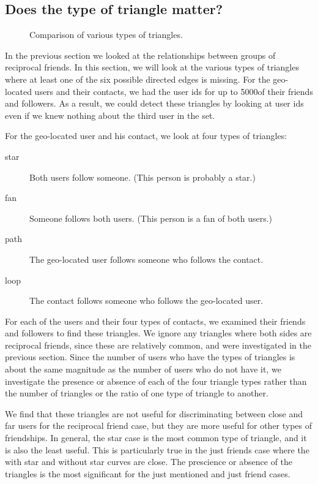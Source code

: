 \documentclass{sig-alternate}
\begin{document}
\subsection{Does the type of triangle matter?}
\begin{figure*}
\centering
{}
\caption{
Comparison of various types of triangles.
}
\label{fig:TriadTypes}
\end{figure*}
In the previous section we looked at the relationships between groups of reciprocal friends.
In this section, we will look at the various types of triangles where at least one of the six possible directed edges is missing.
For the geo-located users and their contacts, we had the user ids for up to 5000of their friends and followers. As a result, we could detect these triangles by looking at user ids even if we knew nothing about the third user in the set.

For the geo-located user and his contact, we look at four types of triangles:
\begin{description}
\item[star] Both users follow someone. (This person is probably a star.)
\item[fan] Someone follows both users. (This person is a fan of both users.)
\item[path] The geo-located user follows someone who follows the contact.
\item[loop] The contact follows someone who follows the geo-located user.
\end{description}

For each of the users and their four types of contacts, we examined their
friends and followers to find these triangles.
We ignore any triangles where both sides are reciprocal friends, since these are relatively common, and were investigated in the previous section.
Since the number of users who have the types of triangles is about the same magnitude as the number of users who do not have it, we investigate the presence or absence of each of the four triangle types rather than the number of triangles or the ratio of one type of triangle to another.

We find that these triangles are not useful for discriminating between close and far users for the reciprocal friend case, but they are more useful for other types of friendships.
In general, the star case is the most common type of triangle, and it is also the least useful. This is particularly true in the just friends case where the with star and without star curves are close.
The prescience or absence of the triangles is the most significant for the just mentioned and just friend cases.
\end{document}
